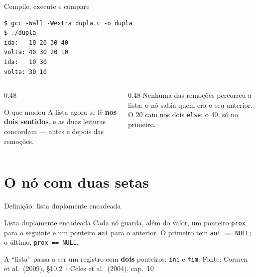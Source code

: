 \documentclass[aspectratio=169]{beamer}
\newcommand{\dno}[4][UFSBlue]{%
  \node[cel, draw=#1, anchor=west] (#2a) at #3 {};
  \node[celv, draw=#1, fill=#1!8, right=0pt of #2a] (#2v) {#4};
  \node[cel, draw=#1, right=0pt of #2v] (#2p) {};
}
\newcommand{\vai}[3][seta]{\draw[#1] ($(#2p.center)+(0,0.1)$) -- ($(#3a.west)+(0,0.1)$);}
\newcommand{\volta}[3][seta]{\draw[#1] ($(#3a.center)+(0,-0.1)$) -- ($(#2p.east)+(0,-0.1)$);}
\newcommand{\liga}[2]{\vai{#1}{#2}\volta{#1}{#2}}
\newcommand{\cnull}[1]{\draw[UFSGray] (#1.south west) -- (#1.north east);}
\newcommand{\fonte}[1]{\vfill\hfill{\scriptsize\textcolor{UFSGray}{Fonte: #1}}}
\begin{document}
\begin{frame}[fragile]{Compile, execute e compare}
\begin{lstlisting}[style=shellStyle]
$ gcc -Wall -Wextra dupla.c -o dupla
$ ./dupla
ida:   10 20 30 40
volta: 40 30 20 10
ida:   10 30
volta: 30 10
\end{lstlisting}
  \begin{columns}[T]
    \begin{column}{0.48\textwidth}
      \begin{block}{O que mudou}
        \small A lista agora se lê \textbf{nos dois sentidos}, e as duas
        leituras concordam --- antes e depois das remoções.
      \end{block}
    \end{column}
    \begin{column}{0.48\textwidth}
      \small Nenhuma das remoções percorreu a lista: o nó sabia quem era o
      seu anterior. O 20 caiu nos dois \texttt{else}; o 40, só no primeiro.
    \end{column}
  \end{columns}
\end{frame}

\section{O nó com duas setas}

\begin{frame}{Definição: lista duplamente encadeada}
  \begin{block}{Lista duplamente encadeada}
    \small Cada nó guarda, além do valor, um ponteiro \texttt{prox} para o
    seguinte e um ponteiro \texttt{ant} para o anterior. O primeiro tem
    \texttt{ant == NULL}; o último, \texttt{prox == NULL}.
  \end{block}
  \begin{center}
  \end{center}
  \small A ``lista'' passa a ser um registro com \textbf{dois} ponteiros:
  \texttt{ini} e \texttt{fim}.
  \fonte{Cormen et al.\ (2009), §10.2~\cite{cormen2009introduction};
    Celes et al.\ (2004), cap.~10~\cite{celes2004introducao}}
\end{frame}
\end{document}
